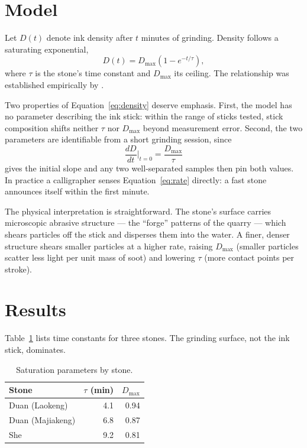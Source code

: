 \documentclass[letterpaper]{article} %
\begin{document}
\section{Model}

Let $D(t)$ denote ink density after $t$ minutes of grinding. Density
follows a saturating exponential,
\begin{equation}
  \label{eq:density}
  D(t) = D_{\max}\left(1 - e^{-t/\tau}\right),
\end{equation}
where $\tau$ is the stone's time constant and $D_{\max}$ its ceiling.
The relationship was established empirically by \citet{tanaka2019}.

Two properties of Equation~\ref{eq:density} deserve emphasis. First,
the model has no parameter describing the ink stick: within the range
of sticks tested, stick composition shifts neither $\tau$ nor
$D_{\max}$ beyond measurement error. Second, the two parameters are
identifiable from a short grinding session, since
\begin{equation}
  \label{eq:rate}
  \frac{dD}{dt}\Big|_{t=0} = \frac{D_{\max}}{\tau}
\end{equation}
gives the initial slope and any two well-separated samples then pin
both values. In practice a calligrapher senses Equation~\ref{eq:rate}
directly: a fast stone announces itself within the first minute.

The physical interpretation is straightforward. The stone's surface
carries microscopic abrasive structure --- the ``forge'' patterns of
the quarry --- which shears particles off the stick and disperses them
into the water. A finer, denser structure shears smaller particles at
a higher rate, raising $D_{\max}$ (smaller particles scatter less
light per unit mass of soot) and lowering $\tau$ (more contact points
per stroke).

\section{Results}

Table~\ref{tab:stones} lists time constants for three stones. The
grinding surface, not the ink stick, dominates.

\begin{table}[t]
\centering
\begin{tabular}{lrr}
\toprule
Stone & $\tau$ (min) & $D_{\max}$ \\
\midrule
Duan (Laokeng)  & 4.1 & 0.94 \\
Duan (Majiakeng) & 6.8 & 0.87 \\
She             & 9.2 & 0.81 \\
\bottomrule
\end{tabular}
\caption{Saturation parameters by stone.}
\label{tab:stones}
\end{table}
\end{document}

